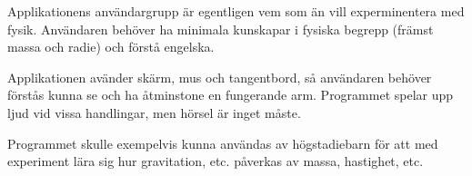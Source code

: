 Applikationens användargrupp är egentligen vem som än vill experminentera
med fysik. Användaren behöver ha minimala kunskapar i fysiska begrepp
(främst massa och radie) och förstå engelska.

Applikationen avänder skärm, mus och tangentbord, så användaren behöver
förstås kunna se och ha åtminstone en fungerande arm.
Programmet spelar upp ljud vid vissa handlingar, men hörsel är inget
måste.

Programmet skulle exempelvis kunna användas av högstadiebarn för att med 
experiment lära sig hur gravitation, etc. påverkas
av massa, hastighet, etc.

